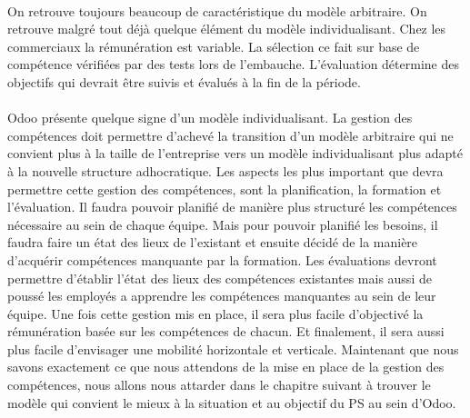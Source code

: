 \paragraph{} On retrouve toujours beaucoup de caractéristique du modèle arbitraire. On retrouve malgré tout déjà quelque élément du modèle individualisant. Chez les commerciaux la rémunération est variable. La sélection ce fait sur base de compétence vérifiées par des tests lors de l'embauche. L'évaluation détermine des objectifs qui devrait être suivis et évalués à la fin de la période.


\paragraph{} Odoo présente quelque signe d'un modèle individualisant. La gestion des compétences doit permettre d'achevé la transition d'un modèle arbitraire qui ne convient plus à la taille de l'entreprise vers un modèle individualisant plus adapté à la nouvelle structure adhocratique. Les aspects les plus important que devra permettre cette gestion des compétences, sont la planification, la formation et l'évaluation. Il faudra pouvoir planifié de manière plus structuré les compétences nécessaire au sein de chaque équipe. Mais pour pouvoir planifié les besoins, il faudra faire un état des lieux de l'existant et ensuite décidé de la manière d'acquérir compétences manquante par la formation. Les évaluations devront permettre d'établir l'état des lieux des compétences existantes mais aussi de poussé les employés a apprendre les compétences manquantes au sein de leur équipe. Une fois cette gestion mis en place, il sera plus facile d'objectivé la rémunération basée sur les compétences de chacun. Et finalement, il sera aussi plus facile d'envisager une mobilité horizontale et verticale. Maintenant que nous savons exactement ce que nous attendons de la mise en place de la gestion des compétences, nous allons nous attarder dans le chapitre suivant à trouver le modèle qui convient le mieux à la situation et au objectif du PS au sein d'Odoo.







